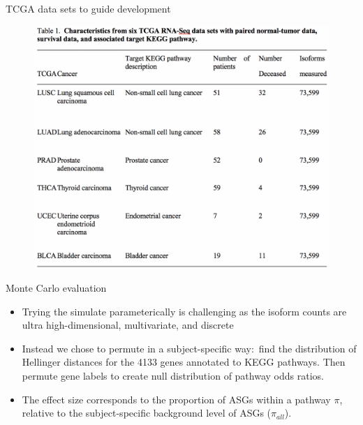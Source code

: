 \documentclass[ignorenonframetext,aspectratio=169,]{beamer}
\begin{document}
\begin{frame}{%
\protect\hypertarget{tcga-data-sets-to-guide-development}{%
TCGA data sets to guide development}}

\begin{figure}[htb]
  \centering \includegraphics[keepaspectratio,width=\textwidth,height=0.8\textheight]{../n1pas/figures/datasets.png}
\end{figure}

\end{frame}

\begin{frame}{%
\protect\hypertarget{monte-carlo-evaluation}{%
Monte Carlo evaluation}}

\begin{itemize}
  \item Trying the simulate parameterically is challenging as the isoform counts are ultra high-dimensional, multivariate, and discrete
  \item Instead we chose to permute in a subject-specific way:~find the distribution of Hellinger distances for the 4133 genes annotated to KEGG pathways. Then permute gene labels to create null distribution of pathway odds ratios.
    \item The effect size corresponds to the proportion of ASGs within a pathway $\pi$, relative to the subject-specific background level of ASGs ($\pi_{all}$).
  \end{itemize}

\end{frame}
\end{document}
